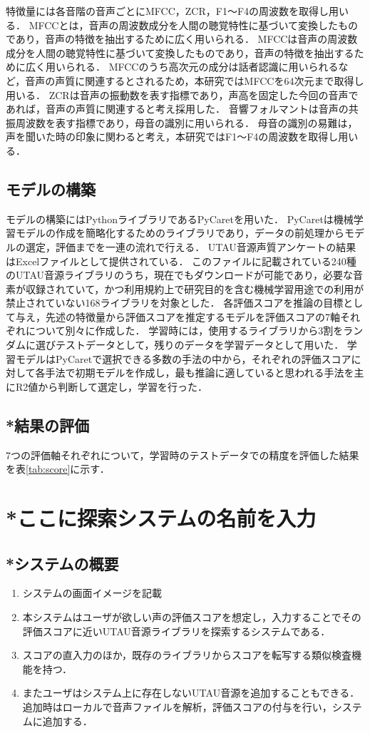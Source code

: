 \documentclass[a4j,8pt,twocolumn]{extarticle}
\begin{document}
特徴量には各音階の音声ごとにMFCC，ZCR，F1〜F4の周波数を取得し用いる．
MFCCとは，音声の周波数成分を人間の聴覚特性に基づいて変換したものであり，音声の特徴を抽出するために広く用いられる．
MFCCは音声の周波数成分を人間の聴覚特性に基づいて変換したものであり，音声の特徴を抽出するために広く用いられる．
MFCCのうち高次元の成分は話者認識に用いられるなど，音声の声質に関連するとされる\cite{}ため，本研究ではMFCCを64次元まで取得し用いる．
ZCRは音声の振動数を表す指標であり，声高を固定した今回の音声であれば，音声の声質に関連すると考え採用した．
音響フォルマントは音声の共振周波数を表す指標であり，母音の識別に用いられる\cite{}．
母音の識別の易難は，声を聞いた時の印象に関わると考え，本研究ではF1〜F4の周波数を取得し用いる．

\subsection{モデルの構築}
モデルの構築にはPythonライブラリであるPyCaretを用いた．
PyCaretは機械学習モデルの作成を簡略化するためのライブラリであり，データの前処理からモデルの選定，評価までを一連の流れで行える．
UTAU音源声質アンケートの結果はExcelファイルとして提供されている．
このファイルに記載されている240種のUTAU音源ライブラリのうち，現在でもダウンロードが可能であり，必要な音素が収録されていて，かつ利用規約上で研究目的を含む機械学習用途での利用が禁止されていない168ライブラリを対象とした．
各評価スコアを推論の目標として与え，先述の特徴量から評価スコアを推定するモデルを評価スコアの7軸それぞれについて別々に作成した．
学習時には，使用するライブラリから3割をランダムに選びテストデータとして，残りのデータを学習データとして用いた．
学習モデルはPyCaretで選択できる多数の手法の中から，それぞれの評価スコアに対して各手法で初期モデルを作成し，最も推論に適していると思われる手法を主にR2値から判断して選定し，学習を行った．

\subsection{*結果の評価}
7つの評価軸それぞれについて，学習時のテストデータでの精度を評価した結果を表\ref{tab:score}に示す．

\section{*ここに探索システムの名前を入力}
\subsection{*システムの概要}
\begin{enumerate}
  \item システムの画面イメージを記載
  \item 本システムはユーザが欲しい声の評価スコアを想定し，入力することでその評価スコアに近いUTAU音源ライブラリを探索するシステムである．
  \item スコアの直入力のほか，既存のライブラリからスコアを転写する類似検査機能を持つ．
  \item またユーザはシステム上に存在しないUTAU音源を追加することもできる．追加時はローカルで音声ファイルを解析，評価スコアの付与を行い，システムに追加する．
\end{enumerate}
\end{document}

